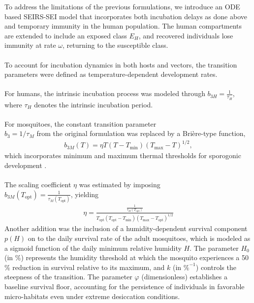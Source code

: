 \documentclass[a4paper,fleqn]{cas-dc}
\begin{document}
To address the limitations of the previous formulations, we introduce an ODE based SEIRS-SEI model that incorporates 
both incubation delays as done above and temporary immunity in the human population. The human compartments 
are extended to include an exposed class $E_H$, and recovered individuals lose immunity at rate $\omega$, returning to the susceptible class.
\\\\
To account for incubation dynamics in both hosts and vectors, the transition parameters were defined as temperature-dependent development rates. 
\\\\
For humans, the intrinsic incubation process was modeled through
$b_{3H} = \frac{1}{\tau_H}$,
where $\tau_H$ denotes the intrinsic incubation period.
\\\\
For mosquitoes, the constant transition parameter \\$b_3 = 1/\tau_M$ from the original formulation was replaced by a Brière-type function,
\begin{align}
b_{3M}(T)=\eta T(T-T_{\min})(T_{\max}-T)^{1/2},
\label{eq:b3m}
\end{align}
which incorporates minimum and maximum thermal thresholds for sporogonic development \cite{brierre_function_development_rate, ab_gumel_malaria_review}. 
\\\\
The scaling coefficient $\eta$ was estimated by imposing \\$b_{3M}(T_{\mathrm{opt}})=\frac{1}{\tau_M(T_{\mathrm{opt}})}$,
yielding
\begin{align}
\eta=
\frac{\frac{1}{\tau_M(T_{\mathrm{opt}})}}{
T_{\mathrm{opt}}
(T_{\mathrm{opt}}-T_{\min})
(T_{\max}-T_{\mathrm{opt}})^{1/2}
}
\end{align}
Another addition was the inclusion of a humidity-dependent survival component $p(H)$ on to the daily survival rate of the adult mosquitoes, which is modeled as a sigmoid function of the daily minimum relative humidity $H$. The parameter $H_0$ (in $\%$) represents the humidity threshold at which the mosquito experiences a 50$\%$ reduction in survival relative to its maximum, and $k$ (in $\%^{-1}$) controls the steepness of the transition. The parameter $\varphi$ (dimensionless) establishes a baseline survival floor, accounting for the persistence of individuals in favorable micro-habitats even under extreme desiccation conditions.
\end{document}
